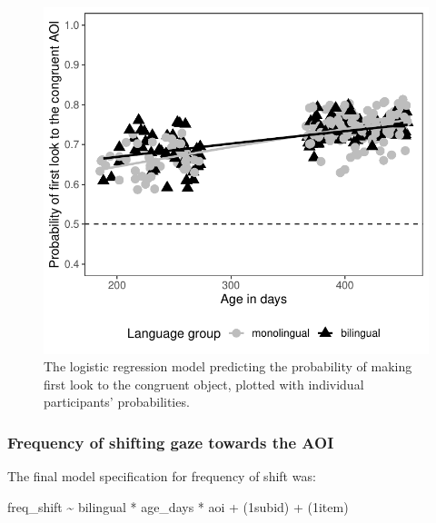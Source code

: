 \documentclass[,man,floatsintext]{apa6}
\begin{document}
\begin{figure}
\centering
\includegraphics{gaze-following-paper_files/figure-latex/fig6-1.pdf}
\caption{\label{fig:fig6}The logistic regression model predicting the probability of making first look to the congruent object, plotted with individual participants' probabilities.}
\end{figure}

\hypertarget{frequency-of-shifting-gaze-towards-the-aoi}{%
\subsubsection{Frequency of shifting gaze towards the AOI}\label{frequency-of-shifting-gaze-towards-the-aoi}}

The final model specification for frequency of shift was:

freq\_shift \textasciitilde{} bilingual * age\_days * aoi +
(1\textbar{}subid) +
(1\textbar{}item)
\end{document}
